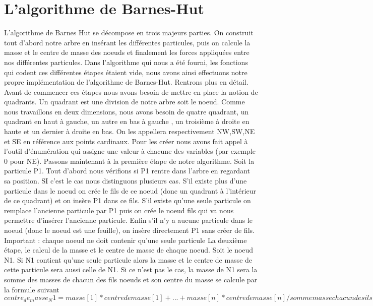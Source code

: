 \section{L'algorithme de Barnes-Hut}
L'algorithme de Barnes Hut se décompose en trois majeurs parties. On construit tout d'abord notre arbre en insérant les différentes particules, puis on calcule la masse et le centre de masse des noeuds et finalement les forces appliquées entre nos différentes particules. Dans l'algorithme qui nous a été fourni, les fonctions qui codent ces différentes étapes étaient vide, nous avons ainsi effectuons notre propre implémentation de l'algorithme de Barnes-Hut. Rentrons plus en détail.
\newline
Avant de commencer ces étapes nous avons besoin de mettre en place la notion de quadrants. Un quadrant est une division de notre arbre soit le noeud. Comme nous travaillons en deux dimensions, nous avons besoin de quatre quadrant, un quadrant en haut à gauche, un autre en bas à gauche , un troisième à droite en haute et un dernier à droite en bas. On les appellera respectivement NW,SW,NE et SE en référence aux points cardinaux. Pour les créer nous avons fait appel à l'outil d'énumération qui assigne une valeur à chacune des variables (par exemple 0 pour NE).
\newline
Passons maintenant à la première étape de notre algorithme.
\newline
Soit la particule P1. Tout d'abord nous vérifions si P1 rentre dans l'arbre en regardant sa position.
SI c'est le cas nous distinguons plusieurs cas. S'il existe plus d'une particule dans le noeud on crée le fils de ce noeud (donc un quadrant à l'intérieur de ce quadrant) et on insère P1 dans ce fils. S'il existe qu'une seule particule on remplace l'ancienne particule par P1 puis on crée le noeud fils qui va nous permettre d'insérer l'ancienne particule. Enfin s'il n'y a aucune particule dans le noeud (donc le noeud est une feuille), on insère directement P1 sans créer de fils.
Important : chaque noeud ne doit contenir qu'une seule particule
\newline
La deuxième étape, le calcul de la masse et le centre de masse de chaque noeud.
\newline
Soit le noeud N1. Si N1 contient qu'une seule particule alors la masse et le centre de masse de cette particule sera aussi celle de N1. Si ce n'est pas le cas, la masse de N1 sera la somme des masses de chacun des fils noeuds et son centre du masse se calcule par la formule suivant
\begin{equation}
    centre_de_masse_N1=masse[1]*centredemasse[1] +...+ masse[n]*centredemasse[n]/sommemassechacundes ils
\end{equation}
